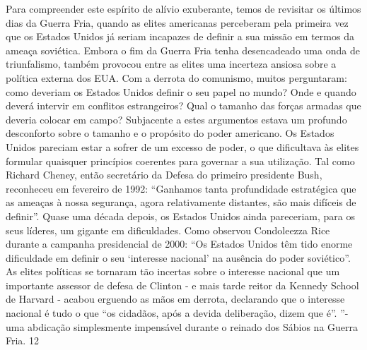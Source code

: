  
\par
 
Para compreender este espírito de alívio exuberante, temos de revisitar os últimos dias da Guerra Fria, quando as elites americanas perceberam pela primeira vez que os Estados Unidos já seriam incapazes de definir a sua missão em termos da ameaça soviética. Embora o fim da Guerra Fria tenha desencadeado uma onda de triunfalismo, também provocou entre as elites uma incerteza ansiosa sobre a política externa dos EUA. Com a derrota do comunismo, muitos perguntaram: como deveriam os Estados Unidos definir o seu papel no mundo? Onde e quando deverá intervir em conflitos estrangeiros? Qual o tamanho das forças armadas que deveria colocar em campo? Subjacente a estes argumentos estava um profundo desconforto sobre o tamanho e o propósito do poder americano. Os Estados Unidos pareciam estar a sofrer de um excesso de poder, o que dificultava às elites formular quaisquer princípios coerentes para governar a sua utilização. Tal como Richard Cheney, então secretário da Defesa do primeiro presidente Bush, reconheceu em fevereiro de 1992: “Ganhamos tanta profundidade estratégica que as ameaças à nossa segurança, agora relativamente distantes, são mais difíceis de definir”. Quase uma década depois, os Estados Unidos ainda pareceriam, para os seus líderes, um gigante em dificuldades. Como observou Condoleezza Rice durante a campanha presidencial de 2000: “Os Estados Unidos têm tido enorme dificuldade em definir o seu ‘interesse nacional’ na ausência do poder soviético”. As elites políticas se tornaram tão incertas sobre o interesse nacional que um importante assessor de defesa de Clinton - e mais tarde reitor da Kennedy School de Harvard - acabou erguendo as mãos em derrota, declarando que o interesse nacional é tudo o que “os cidadãos, após a devida deliberação, dizem que é”. ”- uma abdicação simplesmente impensável durante o reinado dos Sábios na Guerra Fria.
 {\color{blue} 12}  

 
\par
 
